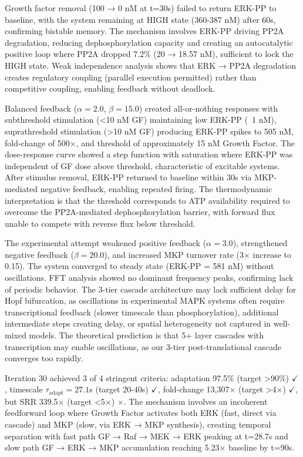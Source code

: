 \documentclass[twocolumn,11pt]{article}
\begin{document}
Growth factor removal (100 → 0 nM at t=30s) failed to return ERK-PP to baseline, with the system remaining at HIGH state (360-387 nM) after 60s, confirming bistable memory. The mechanism involves ERK-PP driving PP2A degradation, reducing dephosphorylation capacity and creating an autocatalytic positive loop where PP2A dropped 7.2\% (20 → 18.57 nM), sufficient to lock the HIGH state. Weak independence analysis shows that ERK → PP2A degradation creates regulatory coupling (parallel execution permitted) rather than competitive coupling, enabling feedback without deadlock.

Balanced feedback ($\alpha = 2.0$, $\beta = 15.0$) created all-or-nothing responses with subthreshold stimulation (<10 nM GF) maintaining low ERK-PP (~1 nM), suprathreshold stimulation (>10 nM GF) producing ERK-PP spikes to 505 nM, fold-change of 500×, and threshold of approximately 15 nM Growth Factor. The dose-response curve showed a step function with saturation where ERK-PP was independent of GF dose above threshold, characteristic of excitable systems. After stimulus removal, ERK-PP returned to baseline within 30s via MKP-mediated negative feedback, enabling repeated firing. The thermodynamic interpretation is that the threshold corresponds to ATP availability required to overcome the PP2A-mediated dephosphorylation barrier, with forward flux unable to compete with reverse flux below threshold.

The experimental attempt weakened positive feedback ($\alpha = 3.0$), strengthened negative feedback ($\beta = 20.0$), and increased MKP turnover rate (3× increase to 0.15). The system converged to steady state (ERK-PP = 581 nM) without oscillations. FFT analysis showed no dominant frequency peaks, confirming lack of periodic behavior. The 3-tier cascade architecture may lack sufficient delay for Hopf bifurcation, as oscillations in experimental MAPK systems often require transcriptional feedback (slower timescale than phosphorylation), additional intermediate steps creating delay, or spatial heterogeneity not captured in well-mixed models. The theoretical prediction is that 5+ layer cascades with transcription may enable oscillations, as our 3-tier post-translational cascade converges too rapidly.

Iteration 30 achieved 3 of 4 stringent criteria: adaptation 97.5\% (target >90\%) $\checkmark$, timescale $\tau_{\text{adapt}} = 27.1$s (target 20-40s) $\checkmark$, fold-change 13,307× (target >4×) $\checkmark$, but SRR 339.5× (target <5×) $\times$. The mechanism involves an incoherent feedforward loop where Growth Factor activates both ERK (fast, direct via cascade) and MKP (slow, via ERK → MKP synthesis), creating temporal separation with fast path GF → Raf → MEK → ERK peaking at t=28.7s and slow path GF → ERK → MKP accumulation reaching 5.23× baseline by t=90s.
\end{document}
